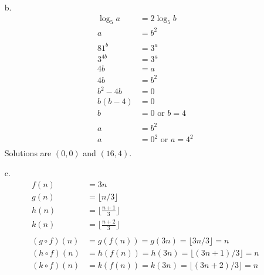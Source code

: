 \documentclass{article}
\begin{document}
\begin{enumerate}
    \item[b. ]  \[\begin{aligned}
                \log_5 a & = 2 \log_5 b              \\
                a        & = b^2                     \\
                \\
                81^b     & = 3^a                     \\
                3^{4b}   & = 3^a                     \\
                4b       & = a                       \\
                4b       & = b^2                     \\
                b^2 - 4b & = 0                       \\
                b(b-4)   & = 0                       \\
                b        & = 0 \text{ or } b = 4     \\
                \\
                a        & = b^2                     \\
                a        & = 0^2 \text{ or } a = 4^2 \\
            \end{aligned}\]
        Solutions are $(0,0)$ and $(16,4)$.
    \item[c.] \[\begin{aligned}
                f(n)          & = 3n                                             \\
                g(n)          & = \lfloor{n/3}\rfloor                            \\
                h(n)          & = \lfloor{\frac{n+1}{3}}\rfloor                  \\
                k(n)          & = \lfloor{\frac{n+2}{3}}\rfloor                  \\
                \\
                (g\circ f)(n) & = g(f(n)) = g(3n) = \lfloor{3n/3}\rfloor = n     \\
                (h\circ f)(n) & = h(f(n)) = h(3n) = \lfloor{(3n+1)/3}\rfloor = n \\
                (k\circ f)(n) & = k(f(n)) = k(3n) = \lfloor{(3n+2)/3}\rfloor = n \\
            \end{aligned}\]
\end{enumerate}
\end{document}
